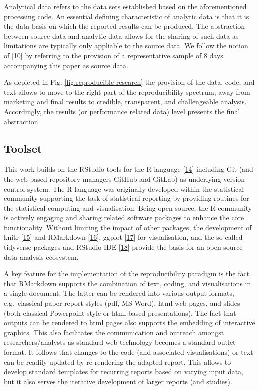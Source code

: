 \documentclass[conference,final,a4paper,]{IEEEtran}
\begin{document}
Analytical data refers to the data sets established based on the
aforementioned processing code. An essential defining characteristic of
analytic data is that it is the data basis on which the reported results
can be produced. The abstraction between source data and analytic data
allows for the sharing of such data as limitations are typically only
appliable to the source data. We follow the notion of
{[}\protect\hyperlink{ref-marwick_2017}{10}{]} by referring to the
provision of a representative sample of 8 days accompanying this paper
as source data.

As depicted in Fig. \ref{fig:reproducible-research} the provision of the
data, code, and text allows to move to the right part of the
reproducibility spectrum, away from marketing and final results to
credible, transparent, and challengeable analysis. Accordingly, the
results (or performance related data) level presents the final
abstraction.

\subsection{Toolset}\label{toolset}

This work builds on the RStudio tools for the R language
{[}\protect\hyperlink{ref-rcoreteam_2018}{14}{]} including Git (and the
web-based repository managers GitHub and GitLab) as underlying version
control system. The R language was originally developed within the
statistical community supporting the task of statistical reporting by
providing routines for the statistical computing and visualisation.
Being open source, the R community is actively engaging and sharing
related software packages to enhance the core functionality. Without
limiting the impact of other packages, the development of knitr
{[}\protect\hyperlink{ref-R-knitr}{15}{]} and RMarkdown
{[}\protect\hyperlink{ref-xie2018}{16}{]}, ggplot
{[}\protect\hyperlink{ref-wickham_2016}{17}{]} for visualisation, and
the so-called tidyverse packages and RStudio IDE
{[}\protect\hyperlink{ref-rstudioteam_2015}{18}{]} provide the basis for
an open source data analysis ecosystem.

A key feature for the implementation of the reproducibility paradigm is
the fact that RMarkdown supports the combination of text, coding, and
visualisations in a single document. The latter can be rendered into
various output formats, e.g.~classical paper report-styles (pdf, MS
Word), html web-pages, and slides (both classical Powerpoint style or
html-based presentations). The fact that outputs can be rendered to html
pages also supports the embedding of interactive graphics. This also
facilitates the communication and outreach amongst researchers/analysts
as standard web technology becomes a standard outlet format. It follows
that changes to the code (and associated visualisations) or text can be
readily updated by re-rendering the adapted report. This allows to
develop standard templates for recurring reports based on varying input
data, but it also serves the iterative development of larger reports
(and studies).
\end{document}
